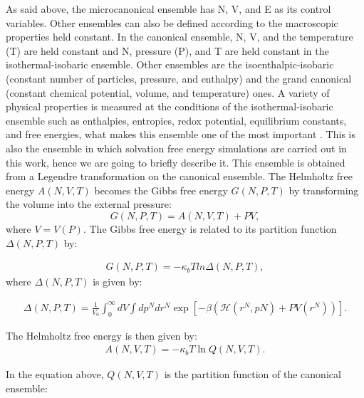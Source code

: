 As said above, the microcanonical ensemble  has  N, V, and E as its control variables. Other ensembles can also be defined according to the macroscopic properties held constant.  In the canonical ensemble,  N, V, and the temperature (T) are held constant and  N, pressure (P), and T are held constant in the isothermal-isobaric ensemble. Other ensembles are the isoenthalpic-isobaric (constant number of particles, pressure, and enthalpy) and the grand canonical (constant chemical potential, volume, and temperature) ones. A variety of physical properties is measured at the conditions of the isothermal-isobaric ensemble such as enthalpies, entropies, redox potential, equilibrium constants, and free energies, what makes this ensemble one of the most important \cite{tuckerman}. This is also the ensemble in which solvation free energy simulations are carried out in this work, hence we are going to briefly describe it. This ensemble is obtained from a Legendre transformation on the canonical ensemble. The Helmholtz free energy $A(N,V,T)$ becomes the Gibbs free energy $G(N,P,T)$ by transforming the volume into the external pressure:
\begin{equation}
G(N,P,T) = A(N,V,T) + PV,
\label{eq:gcm}
\end{equation}
where $V = V(P)$. The Gibbs free energy is related to its partition function $\Delta (N,P,T)$ by:

\begin{equation}
\label{eq:fisobari}
\begin{aligned}
G(N,P,T) = -\kappa_{b}T ln \Delta (N,P,T),
\end{aligned}
\end{equation}
where $\Delta (N,P,T)$ is given by: 

\begin{equation}
\begin{aligned}
\Delta (N,P,T) = \frac{1}{V_{0}} \int_{0}^{\infty} dV \int d p^{N} d r^{N} \exp \left[ -\beta \left( \mathcal{H} (r^{N},p{N}) + PV(r^{N}) \right) \right] .
\end{aligned}
\end{equation}

The Helmholtz free energy is then given by:
\begin{equation}
\begin{aligned}
A(N,V,T) = -\kappa_{b}T \ln Q(N,V,T).
\end{aligned}
\end{equation}

In the equation above, $Q (N,V,T)$ is the partition function of the canonical ensemble:

